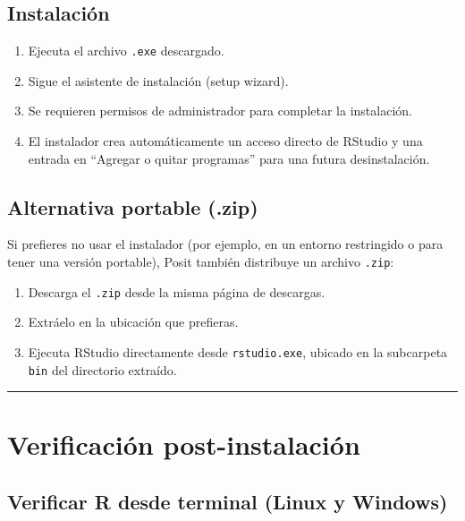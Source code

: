 \documentclass[
  man,
  floatsintext,
  longtable,
  a4paper,
  nolmodern,
  notxfonts,
  notimes,
  12pt,
  colorlinks=true,linkcolor=blue,citecolor=blue,urlcolor=blue]{apa7}
\providecommand{\tightlist}{%
  \setlength{\itemsep}{0pt}\setlength{\parskip}{0pt}}
\begin{document}
\subsection{Instalación}\label{instalaciuxf3n}

\begin{enumerate}
\def\labelenumi{\arabic{enumi}.}
\tightlist
\item
  Ejecuta el archivo \texttt{.exe} descargado.
\item
  Sigue el asistente de instalación (setup wizard).
\item
  Se requieren permisos de administrador para completar la instalación.
\item
  El instalador crea automáticamente un acceso directo de RStudio y una
  entrada en ``Agregar o quitar programas'' para una futura
  desinstalación.
\end{enumerate}

\subsection{Alternativa portable
(.zip)}\label{alternativa-portable-.zip}

Si prefieres no usar el instalador (por ejemplo, en un entorno
restringido o para tener una versión portable), Posit también distribuye
un archivo \texttt{.zip}:

\begin{enumerate}
\def\labelenumi{\arabic{enumi}.}
\tightlist
\item
  Descarga el \texttt{.zip} desde la misma página de descargas.
\item
  Extráelo en la ubicación que prefieras.
\item
  Ejecuta RStudio directamente desde \texttt{rstudio.exe}, ubicado en la
  subcarpeta \texttt{bin} del directorio extraído.
\end{enumerate}

\begin{center}\rule{0.5\linewidth}{0.5pt}\end{center}

\section{Verificación
post-instalación}\label{verificaciuxf3n-post-instalaciuxf3n}

\subsection{Verificar R desde terminal (Linux y
Windows)}\label{verificar-r-desde-terminal-linux-y-windows}
\end{document}
